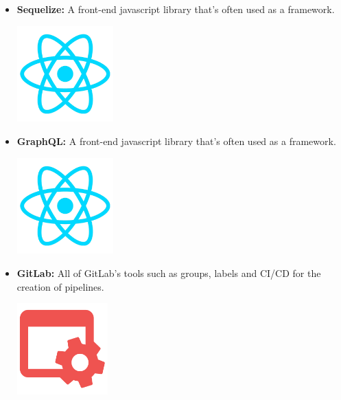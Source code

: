 \begin{itemize}
          \newpage
    \item \textbf{Sequelize:} \newline A front-end javascript library that's often used as a framework. \newline
          \begin{minipage}{\linewidth}
              \centering
              \includegraphics[width=3.7cm]{src/assets/logos/react_512x512.png}
          \end{minipage}
    \item \textbf{GraphQL:} \newline A front-end javascript library that's often used as a framework. \newline
          \begin{minipage}{\linewidth}
              \centering
              \includegraphics[width=3.7cm]{src/assets/logos/react_512x512.png}
          \end{minipage}
    \item \textbf{GitLab:} \newline All of GitLab's tools such as groups, labels and CI/CD for the creation of pipelines. \newline
          \begin{minipage}{\linewidth}
              \centering
              \includegraphics[width=3.5cm]{src/assets/logos/makefile_512x512.png}
          \end{minipage}


\end{itemize}
